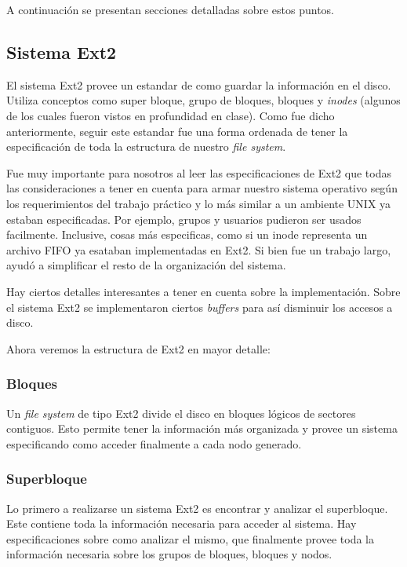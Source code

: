 \documentclass[a4paper,10pt]{article}
\begin{document}
    A continuación se presentan secciones detalladas sobre estos puntos.

    \subsection{Sistema Ext2}
    El sistema Ext2 provee un estandar de como guardar la información en el disco. Utiliza conceptos como super bloque, 
    grupo de bloques, bloques y \textit{inodes} (algunos de los cuales fueron vistos en profundidad en clase). Como fue
    dicho anteriormente, seguir este estandar fue una forma ordenada de tener la especificación de toda la estructura
    de nuestro \textit{file system}.

    Fue muy importante para nosotros al leer las especificaciones de Ext2 que todas las consideraciones a tener en cuenta
    para armar nuestro sistema operativo según los requerimientos del trabajo práctico y lo más similar a un ambiente
    UNIX ya estaban especificadas. Por ejemplo, grupos y usuarios pudieron ser usados facilmente. Inclusive, cosas más
    especificas, como si un inode representa un archivo FIFO ya esataban implementadas en Ext2. Si bien fue un trabajo
    largo, ayudó a simplificar el resto de la organización del sistema.

    Hay ciertos detalles interesantes a tener en cuenta sobre la implementación. Sobre el sistema Ext2 se implementaron
    ciertos \textit{buffers} para así disminuir los accesos a disco.

    Ahora veremos la estructura de Ext2 en mayor detalle:

        \subsubsection{Bloques}

        Un \textit{file system} de tipo Ext2 divide el disco en bloques lógicos de sectores contiguos. Esto permite
        tener la información más organizada y provee un sistema especificando como acceder finalmente a cada nodo
        generado.

        \subsubsection{Superbloque}

        Lo primero a realizarse un sistema Ext2 es encontrar y analizar el superbloque. Este contiene toda la información
        necesaria para acceder al sistema. Hay especificaciones sobre como analizar el mismo, que finalmente provee
        toda la información necesaria sobre los grupos de bloques, bloques y nodos.
\end{document}
